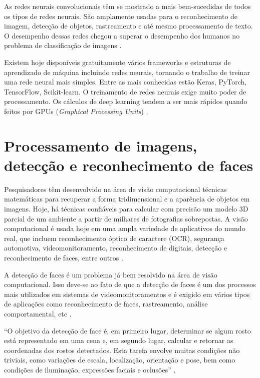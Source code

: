 As redes neurais convolucionais têm se mostrado a mais bem-sucedidas de todos os tipos de redes neurais. São amplamente usadas para o reconhecimento de imagem, detecção de objetos, rastreamento e até mesmo processamento de texto. O desempenho dessas redes chegou a superar o desempenho dos humanos no problema de classificação de imagens \cite{He2016}.

Existem hoje disponíveis gratuitamente vários frameworks e estruturas de aprendizado de máquina incluindo redes neurais, tornando o trabalho de treinar uma rede neural mais simples. Entre as mais conhecidas estão Keras, PyTorch, TensorFlow, Scikit-learn. O treinamento de redes neurais exige muito poder de processamento. Os cálculos de deep learning tendem a ser mais rápidos quando feitos por GPUs (\textit{Graphical Processing Units}) \cite{Heller2019}.


\section{Processamento de imagens, detecção e reconhecimento de faces}
Pesquisadores têm desenvolvido na área de visão computacional técnicas matemáticas para recuperar a forma tridimensional e a aparência de objetos em imagens. Hoje, há técnicas confiáveis para calcular com precisão um modelo 3D parcial de um ambiente a partir de milhares de fotografias sobrepostas. A visão computacional é usada hoje em uma ampla variedade de aplicativos do mundo real, que incluem reconhecimento óptico de caractere (OCR), segurança automotiva, videomonitoramento, reconhecimento de digitais, detecção e reconhecimento de faces, entre outros \cite{Szeliski2011}.

A detecção de faces é um problema já bem resolvido na área de visão computacional. Isso deve-se ao fato de que a detecção de faces é um dos processos mais utilizados em sistemas de videomonitoramentos e é exigido em vários tipos de aplicações como reconhecimento de faces, rastreamento, análise comportamental, etc \cite{Zafeiriou2015}.

“O objetivo da detecção de face é, em primeiro lugar, determinar se algum rosto está representado em uma cena e, em segundo lugar, calcular e retornar as coordenadas dos rostos detectados. Esta tarefa envolve muitas condições não triviais, como variações de escala, localização, orientação e pose, bem como condições de iluminação, expressões faciais e oclusões” \cite{Tsakanikas2018}.

